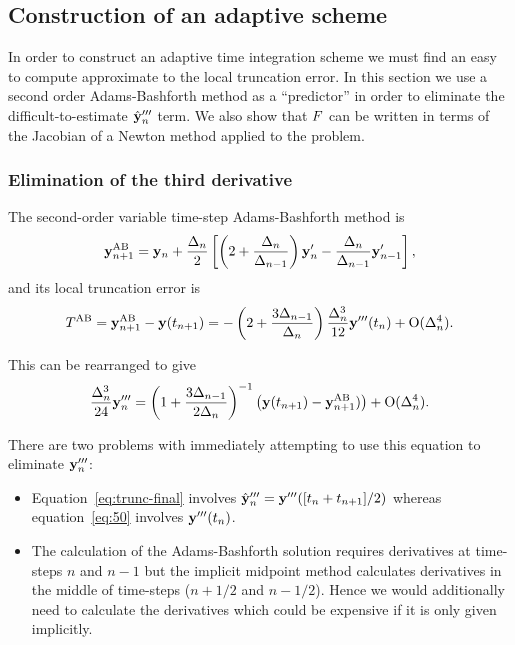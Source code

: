 \subsection{Construction of an adaptive scheme}

In order to construct an adaptive time integration scheme we must find an easy to compute approximate to the local truncation error.
In this section we use a second order Adams-Bashforth method as a ``predictor'' in order to eliminate the difficult-to-estimate $\hat{\mathbf{y}}_n'''$ term.\cite[p.707]{Gresho-Sani}
We also show that $F$ can be written in terms of the Jacobian of a Newton method applied to the problem.

\subsubsection{Elimination of the third derivative}
The second-order variable time-step Adams-Bashforth method is\cite[p.267]{Gresho-Sani}
\begin{equation}
  \mathbf{y}_{n+1}^{\text{AB}} = \mathbf{y}_n + \frac{\Delta_{n}}{2} \left[
    \left (2 + \frac{\Delta_{n}}{\Delta_{n-1}} \right) \mathbf{y}'_n
    - \frac{\Delta_{n}}{\Delta_{n-1}} \mathbf{y}'_{n-1}
    \right],
  \label{eq:AB2}
\end{equation}
and its local truncation error is\cite[p.267]{Gresho-Sani}
\begin{equation}
  T^{\text{AB}} = \mathbf{y}_{n+1}^{\text{AB}} - \mathbf{y}(t_{n+1})
  = - \left( 2 + \frac{3 \Delta_{n-1}}{\Delta_{n}} \right) \frac{\Delta_{n}^3}{12} \mathbf{y}'''(t_n)
  + \text{O}(\Delta_{n}^4).
  \label{eq:AB2LTE}
\end{equation}

This can be rearranged to give
\begin{equation}
  \frac{\Delta_{n}^3}{24} \mathbf{y}'''_n = \left(1 + \frac{3 \Delta_{n-1}}{2\Delta_{n}} \right)^{-1}
  \left( \mathbf{y}(t_{n+1}) - \mathbf{y}_{n+1}^{\text{AB}}) \right) + \text{O}(\Delta_{n}^4).
\label{eq:50}
\end{equation}

There are two problems with immediately attempting to use this equation to eliminate $\mathbf{y}'''_n$:
\begin{itemize}
\item Equation~\eqref{eq:trunc-final} involves $\hat{\mathbf{y}}_n''' = \mathbf{y}'''([t_n +t_{n+1}]/2)$ whereas equation~\eqref{eq:50} involves $\mathbf{y}'''(t_n)$.
\item The calculation of the Adams-Bashforth solution requires derivatives at time-steps $n$ and $n-1$ but the implicit midpoint method calculates derivatives in the middle of time-steps (\ie $n+ 1/2$ and $n - 1/2$).
  Hence we would additionally need to calculate the derivatives which could be expensive if it is only given implicitly.
\end{itemize}

